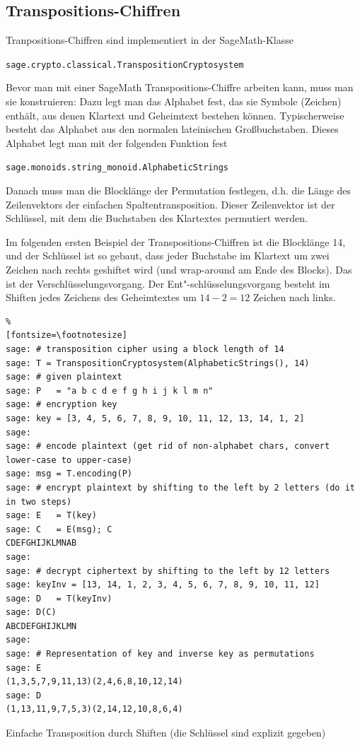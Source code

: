 \begin{refsegment}
\newpage
\subsection{Transpositions-Chiffren}

Tranpositions-Chiffren sind implementiert in der SageMath-Klasse
\begin{center}
\verb!sage.crypto.classical.TranspositionCryptosystem!
\end{center}
Bevor man mit einer SageMath Transpositions-Chiffre arbeiten kann, muss man sie
konstruieren: Dazu legt man das Alphabet fest, das sie Symbole (Zeichen) enthält,
aus denen Klartext und Geheimtext bestehen können.
Typischerweise besteht das Alphabet aus den normalen lateinischen Großbuchstaben.
Dieses Alphabet legt man mit der folgenden Funktion fest
\begin{center}
\verb!sage.monoids.string_monoid.AlphabeticStrings!
\end{center}
Danach muss man die Blocklänge der Permutation festlegen, d.h. die
Länge des Zeilenvektors der einfachen Spaltentransposition.
Dieser Zeilenvektor ist der Schlüssel, mit dem die Buchstaben des
Klartextes permutiert werden.

Im folgenden ersten Beispiel der Transpositions-Chiffren ist die
Blocklänge 14, und der Schlüssel ist so gebaut, dass jeder Buchstabe
im Klartext um zwei Zeichen nach rechts geshiftet wird (und wrap-around
am Ende des Blocks). Das ist der Verschlüsselungsvorgang.
Der Ent"-schlüsselungsvorgang besteht im Shiften jedes Zeichens des
Geheimtextes um $14 - 2 = 12$ Zeichen nach links.

\begin{sagecode}
\begin{Verbatim}%
[fontsize=\footnotesize]
sage: # transposition cipher using a block length of 14
sage: T = TranspositionCryptosystem(AlphabeticStrings(), 14)
sage: # given plaintext
sage: P   = "a b c d e f g h i j k l m n"
sage: # encryption key
sage: key = [3, 4, 5, 6, 7, 8, 9, 10, 11, 12, 13, 14, 1, 2]
sage:
sage: # encode plaintext (get rid of non-alphabet chars, convert lower-case to upper-case)
sage: msg = T.encoding(P)
sage: # encrypt plaintext by shifting to the left by 2 letters (do it in two steps)
sage: E   = T(key)
sage: C   = E(msg); C
CDEFGHIJKLMNAB
sage:
sage: # decrypt ciphertext by shifting to the left by 12 letters
sage: keyInv = [13, 14, 1, 2, 3, 4, 5, 6, 7, 8, 9, 10, 11, 12]
sage: D   = T(keyInv)
sage: D(C)
ABCDEFGHIJKLMN
sage:
sage: # Representation of key and inverse key as permutations
sage: E
(1,3,5,7,9,11,13)(2,4,6,8,10,12,14)
sage: D
(1,13,11,9,7,5,3)(2,14,12,10,8,6,4)
\end{Verbatim}
\caption{Einfache Transposition durch Shiften (die Schlüssel sind explizit gegeben)}
\end{sagecode}


\end{refsegment}
